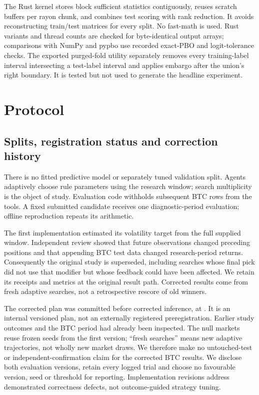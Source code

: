 \documentclass[11pt]{article}
\begin{document}
The Rust kernel stores block sufficient statistics contiguously, reuses scratch
buffers per rayon chunk, and combines test scoring with rank reduction. It avoids
reconstructing train/test matrices for every split. No fast-math is used. Rust
variants and thread counts are checked for byte-identical output arrays;
comparisons with NumPy and pypbo use recorded exact-PBO and logit-tolerance checks.
The exported purged-fold utility separately removes every training-label interval
intersecting a test-label interval and applies embargo after the union's right
boundary. It is tested but not used to generate the headline experiment.

\section{Protocol}
\subsection{Splits, registration status and correction history}
There is no fitted predictive model or separately tuned validation split.
Agents adaptively choose rule parameters using the research window; search
multiplicity is the object of study. Evaluation code withholds subsequent BTC
rows from the tools. A fixed submitted candidate receives one diagnostic-period
evaluation; offline reproduction repeats its arithmetic.

The first implementation estimated its volatility target from the full supplied
window. Independent review showed that future observations changed preceding
positions and that appending BTC test data changed research-period returns.
Consequently the original study is superseded, including searches whose final
pick did not use that modifier but whose feedback could have been affected.
We retain its receipts and metrics at the original result path. Corrected results
come from fresh adaptive searches, not a retrospective rescore of old winners.

The corrected plan was committed before corrected inference, at
\texttt{\ProtocolCommit}. It is an internal versioned plan, not an externally
registered preregistration. Earlier study outcomes and the BTC period had already
been inspected. The null markets reuse frozen seeds from the first version;
``fresh searches'' means new adaptive trajectories, not wholly new market draws.
We therefore make no untouched-test or independent-confirmation
claim for the corrected BTC results. We disclose both evaluation versions, retain
every logged trial and choose no favourable version, seed or threshold for reporting.
Implementation revisions address demonstrated correctness defects, not
outcome-guided strategy tuning.
\end{document}
